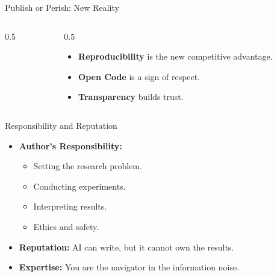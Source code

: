 \documentclass[aspectratio=169]{beamer}
\begin{document}
\begin{frame}[t]{Publish or Perish: New Reality}
    \begin{columns}
        \begin{column}{0.5\textwidth}
        \end{column}
        \begin{column}{0.5\textwidth}
            \begin{itemize}
                \item \textbf{Reproducibility} is the new competitive advantage.
                \item \textbf{Open Code} is a sign of respect.
                \item \textbf{Transparency} builds trust.
            \end{itemize}
        \end{column}
    \end{columns}
\end{frame}

\begin{frame}[t]{Responsibility and Reputation}
    \begin{itemize}
        \item \textbf{Author's Responsibility:}
        \begin{itemize}
            \item Setting the research problem.
            \item Conducting experiments.
            \item Interpreting results.
            \item Ethics and safety.
        \end{itemize}
        \item \textbf{Reputation:} AI can write, but it cannot own the results.
        \item \textbf{Expertise:} You are the navigator in the information noise.
    \end{itemize}
\end{frame}
\end{document}
